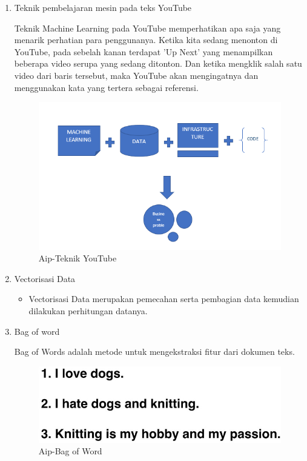 \begin{enumerate}
\item Teknik pembelajaran mesin pada teks YouTube
	\par Teknik Machine Learning pada YouTube memperhatikan apa saja yang menarik perhatian para penggunanya. Ketika kita sedang menonton di YouTube, pada sebelah kanan terdapat 'Up Next' yang menampilkan beberapa video serupa yang sedang ditonton. Dan ketika mengklik salah satu video dari baris tersebut, maka YouTube akan mengingatnya dan menggunakan kata yang tertera sebagai referensi.
	\begin{figure}[!hbtp]
		\centering
		\includegraphics[scale=0.5]{figures/AIP/b3.PNG}
		\caption{Aip-Teknik YouTube}
		\label{contoh}
	\end{figure}

\item Vectorisasi Data
	\begin{itemize}
		\item Vectorisasi Data merupakan pemecahan serta pembagian data kemudian dilakukan perhitungan datanya.
	\end{itemize}
	
\item Bag of word
	\par Bag of Words adalah metode untuk mengekstraksi fitur dari dokumen teks.
	\begin{figure}[!hbtp]
		\centering
		\includegraphics[scale=0.5]{figures/AIP/b4.PNG}
		\caption{Aip-Bag of Word}
		\label{contoh}
	\end{figure}
	

\end{enumerate}
